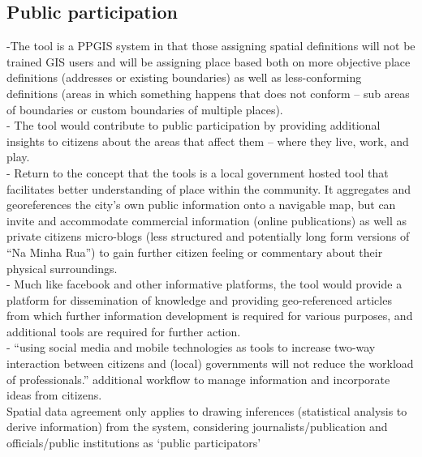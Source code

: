 \subsection{Public participation}
-{\color{purple}The tool is a PPGIS system in that those assigning spatial definitions will not be trained GIS users and will be assigning place based both on more objective place definitions (addresses or existing boundaries) as well as less-conforming definitions (areas in which something happens that does not conform -- sub areas of boundaries or custom boundaries of multiple places).\cite{Brown2012}}\\
-{\color{purple}  The tool would contribute to public participation by providing additional insights to citizens about the areas that affect them -- where they live, work, and play.} \cite{Evans-Cowley2010}\\
-{\color{purple} Return to the concept that the tools is a local government hosted tool that facilitates better understanding of place within the community.  It aggregates and georeferences the city’s own public information onto a navigable map, but can invite and accommodate commercial information (online publications) as well as private citizens micro-blogs (less structured and potentially long form versions of “Na Minha Rua”) to gain further citizen feeling or commentary about their physical surroundings.} \cite{Evans-Cowley2010}\\
-{\color{purple} Much like facebook and other informative platforms, the tool would provide a platform for dissemination of knowledge and providing geo-referenced articles from which further information development is required for various purposes, and additional tools are required for further action.} \cite{Evans-Cowley2010}\\
-{\color{orange} “using social media and mobile technologies as tools to increase two-way interaction between citizens and (local) governments will not reduce the workload of professionals.”} \cite{Kleinhans2015} {\color{purple} additional workflow to manage information and incorporate ideas from citizens.} \cite{Kleinhans2015}\\
{\color{purple}Spatial data agreement only applies to drawing inferences (statistical analysis to derive information) from the system, considering journalists/publication and officials/public institutions as ‘public participators’\cite{Brown2012}}\\


